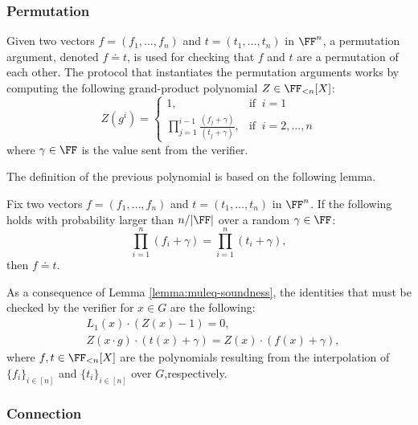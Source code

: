 \subsubsection*{Permutation}

Given two vectors $f = (f_1, \dots, f_n)$ and $t = (t_1, \dots, t_n)$ in $\FF^n$, a permutation argument, denoted $f \doteq t$, is used for checking that $f$ and $t$ are a permutation of each other. The protocol that instantiates the permutation arguments works by computing the following grand-product polynomial $Z \in \FF_{<n}[X]$:
\[
  Z(g^i) = 
  \begin{cases} 
  1, & \text{if }~ i=1 \\ 
  \displaystyle\prod_{j=1}^{i-1} \frac{(f_j + \gamma)}{(t_j + \gamma)}, & \text{if }~ i = 2, \dots, n
  \end{cases} 
\]
where $\gamma \in \FF$ is the value sent from the verifier. 

The definition of the previous polynomial is based on the following lemma.
\begin{lemma}\label{lemma:muleq-soundness}
  Fix two vectors $f = (f_1, \dots, f_n)$ and $t = (t_1, \dots, t_n)$ in $\FF^n$. If the following holds with probability larger than $n/|\FF|$ over a random $\gamma \in \FF$:
  \begin{equation*}
  \prod_{i=1}^n (f_i + \gamma) = \prod_{i=1}^n (t_i + \gamma),
  \end{equation*}
  then $f \doteq t$. 
\end{lemma}

As a consequence of Lemma \ref{lemma:muleq-soundness}, the identities that must be checked by the verifier for $x \in G$ are the following: 
\begin{align*}
&L_1(x) \cdot (Z(x) - 1) = 0, \\
&Z(x \cdot g) \cdot (t(x) + \gamma) = Z(x) \cdot (f(x) + \gamma),
\end{align*}
where $f,t \in \FF_{<n}[X]$ are the polynomials resulting from the interpolation of $\{f_i\}_{i\in[n]}$ and $\{t_i\}_{i\in[n]}$ over $G$,respectively.




\subsubsection*{Connection}

